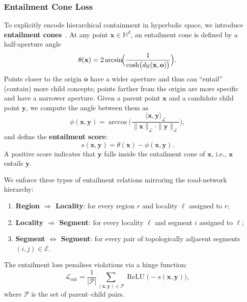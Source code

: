 \subsubsection{Entailment Cone Loss}\label{subsubsec:entail_loss}

To explicitly encode hierarchical containment in hyperbolic space,
we introduce \textbf{entailment cones}~\cite{ganea2018hyperbolic,pal2024hycoclip}.
At any point $\mathbf{x} \in \mathbb{H}^d$, an entailment cone is defined by a half-aperture angle
\begin{equation}\label{eq:aperture}
  \theta(\mathbf{x})
  = 2\arcsin\!\Bigl(\frac{1}{\cosh\bigl(d_{\mathbb{H}}(\mathbf{x}, \mathbf{o})\bigr)}\Bigr).
\end{equation}
Points closer to the origin $\mathbf{o}$ have a wider aperture and thus can ``entail'' (contain) more child concepts;
points farther from the origin are more specific and have a narrower aperture.
Given a parent point $\mathbf{x}$ and a candidate child point $\mathbf{y}$,
we compute the angle between them as
\begin{equation}\label{eq:angle}
  \phi(\mathbf{x}, \mathbf{y})
  = \arccos\!\Biggl(
    \frac{\langle \mathbf{x}, \mathbf{y} \rangle_{\mathcal{L}}}
         {\|\mathbf{x}\|_{\mathcal{L}} \cdot \|\mathbf{y}\|_{\mathcal{L}}}
    \Biggr),
\end{equation}
and define the \textbf{entailment score}:
\begin{equation}\label{eq:entail_score}
  s(\mathbf{x}, \mathbf{y}) = \theta(\mathbf{x}) - \phi(\mathbf{x}, \mathbf{y}).
\end{equation}
A positive score indicates that $\mathbf{y}$ falls inside the entailment cone of $\mathbf{x}$, i.e., $\mathbf{x}$ entails $\mathbf{y}$.

We enforce three types of entailment relations mirroring the road-network hierarchy:
\begin{enumerate}[leftmargin=*,itemsep=2pt]
  \item \textbf{Region $\Rightarrow$ Locality}:
    for every region $r$ and locality $\ell$ assigned to $r$;
  \item \textbf{Locality $\Rightarrow$ Segment}:
    for every locality $\ell$ and segment $i$ assigned to $\ell$;
  \item \textbf{Segment $\Leftrightarrow$ Segment}:
    for every pair of topologically adjacent segments $(i,j) \in \mathcal{E}$.
\end{enumerate}
The entailment loss penalises violations via a hinge function:
\begin{equation}\label{eq:loss_ce}
  \mathcal{L}_{\text{ent}}
  = \frac{1}{|\mathcal{P}|}
    \sum_{(\mathbf{x},\mathbf{y}) \in \mathcal{P}}
    \operatorname{ReLU}\!\bigl(-s(\mathbf{x}, \mathbf{y})\bigr),
\end{equation}
where $\mathcal{P}$ is the set of parent--child pairs.

